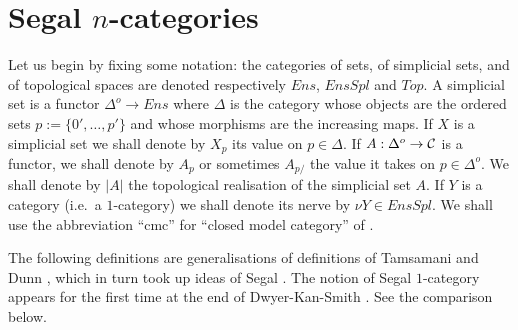 %

\clearpage
\section{Segal \texorpdfstring{$n$}{n}-categories}
\label{ncatsegpage}

Let us begin by fixing some notation: the categories of sets, of simplicial
sets, and of topological spaces are denoted respectively
$Ens$, $EnsSpl$ and $Top$. A simplicial set is a functor
$\Delta ^o\rightarrow Ens$ where $\Delta$ is the category whose objects are
the ordered sets $p:= \{ 0', \ldots , p'\}$ and whose morphisms are the
increasing maps. If $X$ is a simplicial set we shall denote by
$X_p$ its value on $p\in \Delta$. If $A: \Delta
^o\rightarrow {\cal C}$ is a functor, we shall denote by $A_p$ or sometimes $A_{p/}$
the value it takes on $p\in \Delta ^o$.
We shall denote by $|A|$ the topological realisation of the
simplicial set $A$. If $Y$ is a category (i.e.\ a $1$-category) we shall denote
its nerve by $\nu Y \in EnsSpl$. We shall use the abbreviation
``cmc'' for ``closed model category'' of \cite{Quillen}.

The following definitions are generalisations of definitions of
Tamsamani \cite{Tamsamani} and Dunn \cite{Dunn}, which in turn took up
ideas of Segal \cite{SegalTopology} \cite{Adams}.
The notion of Segal $1$-category appears for the first time
at the end of Dwyer-Kan-Smith \cite{DKS}.
See the
comparison below.

